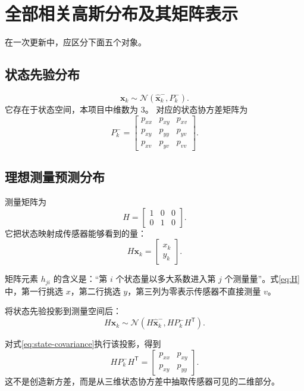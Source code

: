 \documentclass[UTF8,a4paper,11pt]{ctexart}
\newcommand{\prior}{^{-}}
\newcommand{\transpose}{^{\mathsf T}}
\begin{document}
\section{全部相关高斯分布及其矩阵表示}

在一次更新中，应区分下面五个对象。

\subsection{状态先验分布}
\begin{equation}
\bm x_k\sim\mathcal N(\hat{\bm x}_k\prior,P_k\prior).
\end{equation}
它存在于状态空间，本项目中维数为 3。
对应的状态协方差矩阵为
\begin{equation}
P_k\prior=
\begin{bmatrix}
p_{xx}&p_{xy}&p_{xv}\\
p_{xy}&p_{yy}&p_{yv}\\
p_{xv}&p_{yv}&p_{vv}
\end{bmatrix}.
\label{eq:state-covariance}
\end{equation}

\subsection{理想测量预测分布}

测量矩阵为
\begin{equation}
H=
\begin{bmatrix}
1&0&0\\
0&1&0
\end{bmatrix}.
\label{eq:H}
\end{equation}
它把状态映射成传感器能够看到的量：
\begin{equation}
H\bm x_k=
\begin{bmatrix}x_k\\y_k\end{bmatrix}.
\end{equation}

矩阵元素 $h_{ji}$ 的含义是：“第 $i$ 个状态量以多大系数进入第 $j$ 个测量量”。式\eqref{eq:H} 中，第一行挑选 $x$，第二行挑选 $y$，第三列为零表示传感器不直接测量 $v$。

将状态先验投影到测量空间后：
\begin{equation}
H\bm x_k\sim
\mathcal N(H\hat{\bm x}_k\prior,HP_k\prior H\transpose).
\end{equation}

对式\eqref{eq:state-covariance}执行该投影，得到
\begin{equation}
HP_k\prior H\transpose=
\begin{bmatrix}
p_{xx}&p_{xy}\\
p_{xy}&p_{yy}
\end{bmatrix}.
\end{equation}
这不是创造新方差，而是从三维状态协方差中抽取传感器可见的二维部分。
\end{document}
